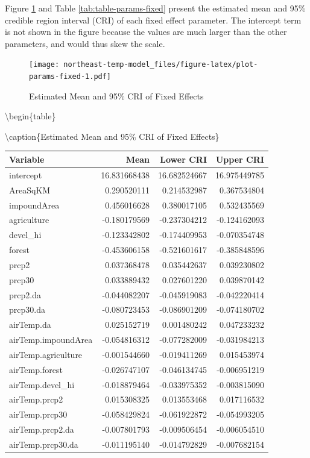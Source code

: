 \documentclass[
]{book}
\begin{document}
Figure \ref{fig:plot-params-fixed} and Table \ref{tab:table-params-fixed} present the estimated mean and 95\% credible region interval (CRI) of each fixed effect parameter. The intercept term is not shown in the figure because the values are much larger than the other parameters, and would thus skew the scale.

\begin{figure}
\centering
\texttt{[image: northeast-temp-model\_files/figure-latex/plot-params-fixed-1.pdf]}
\caption{\label{fig:plot-params-fixed}Estimated Mean and 95\% CRI of Fixed Effects}
\end{figure}

\textbackslash begin\{table\}

\textbackslash caption\{\label{tab:table-params-fixed}Estimated Mean and 95\% CRI of Fixed Effects\}
\centering

\begin{tabular}[t]{l|r|r|r}
\hline
Variable & Mean & Lower CRI & Upper CRI\\
\hline
intercept & 16.831668438 & 16.682524667 & 16.975449785\\
\hline
AreaSqKM & 0.290520111 & 0.214532987 & 0.367534804\\
\hline
impoundArea & 0.456016628 & 0.380017105 & 0.532435569\\
\hline
agriculture & -0.180179569 & -0.237304212 & -0.124162093\\
\hline
devel\_hi & -0.123342802 & -0.174409953 & -0.070354748\\
\hline
forest & -0.453606158 & -0.521601617 & -0.385848596\\
\hline
prcp2 & 0.037368478 & 0.035442637 & 0.039230802\\
\hline
prcp30 & 0.033889432 & 0.027601220 & 0.039870142\\
\hline
prcp2.da & -0.044082207 & -0.045919083 & -0.042220414\\
\hline
prcp30.da & -0.080723453 & -0.086901209 & -0.074180702\\
\hline
airTemp.da & 0.025152719 & 0.001480242 & 0.047233232\\
\hline
airTemp.impoundArea & -0.054816312 & -0.077282009 & -0.031984213\\
\hline
airTemp.agriculture & -0.001544660 & -0.019411269 & 0.015453974\\
\hline
airTemp.forest & -0.026747107 & -0.046134745 & -0.006951219\\
\hline
airTemp.devel\_hi & -0.018879464 & -0.033975352 & -0.003815090\\
\hline
airTemp.prcp2 & 0.015308325 & 0.013553468 & 0.017116532\\
\hline
airTemp.prcp30 & -0.058429824 & -0.061922872 & -0.054993205\\
\hline
airTemp.prcp2.da & -0.007801793 & -0.009506454 & -0.006054510\\
\hline
airTemp.prcp30.da & -0.011195140 & -0.014792829 & -0.007682154\\
\hline
\end{tabular}
\end{document}
